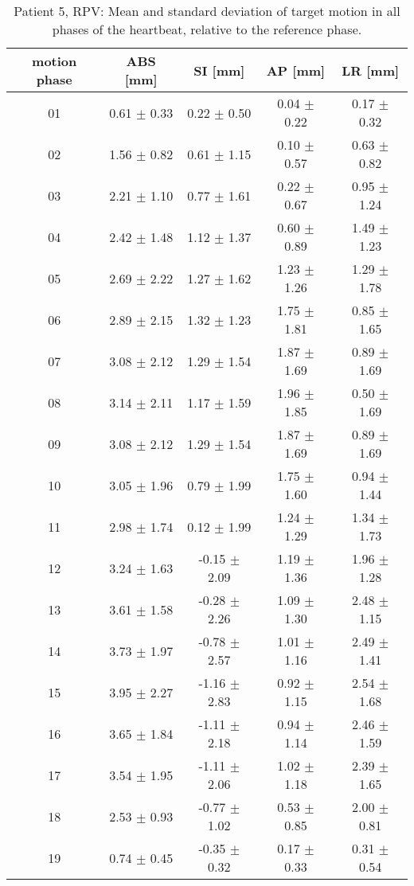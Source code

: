 \begin{table}[htbp]
  \centering
    \tiny
  \caption{Patient 5, RPV: Mean and standard deviation of target motion in all phases of the heartbeat, relative to the reference phase.}
  \begin{tabular}{|c|c|c|c|c|}
    \hline\hline
    motion phase\rule{0pt}{2.6ex}\rule[-1.2ex]{0pt}{0pt} & ABS [mm] & SI [mm] & AP [mm] & LR [mm]\\
    \hline
01& 0.61 $\pm$ 0.33& 0.22 $\pm$ 0.50& 0.04 $\pm$ 0.22& 0.17 $\pm$ 0.32 \\
02& 1.56 $\pm$ 0.82& 0.61 $\pm$ 1.15& 0.10 $\pm$ 0.57& 0.63 $\pm$ 0.82 \\ 
03& 2.21 $\pm$ 1.10& 0.77 $\pm$ 1.61& 0.22 $\pm$ 0.67& 0.95 $\pm$ 1.24 \\
04& 2.42 $\pm$ 1.48& 1.12 $\pm$ 1.37& 0.60 $\pm$ 0.89& 1.49 $\pm$ 1.23 \\
05& 2.69 $\pm$ 2.22& 1.27 $\pm$ 1.62& 1.23 $\pm$ 1.26& 1.29 $\pm$ 1.78 \\
06& 2.89 $\pm$ 2.15& 1.32 $\pm$ 1.23& 1.75 $\pm$ 1.81& 0.85 $\pm$ 1.65 \\
07& 3.08 $\pm$ 2.12& 1.29 $\pm$ 1.54& 1.87 $\pm$ 1.69& 0.89 $\pm$ 1.69 \\
08& 3.14 $\pm$ 2.11& 1.17 $\pm$ 1.59& 1.96 $\pm$ 1.85& 0.50 $\pm$ 1.69 \\
09& 3.08 $\pm$ 2.12& 1.29 $\pm$ 1.54& 1.87 $\pm$ 1.69& 0.89 $\pm$ 1.69 \\
10& 3.05 $\pm$ 1.96& 0.79 $\pm$ 1.99& 1.75 $\pm$ 1.60& 0.94 $\pm$ 1.44 \\
11& 2.98 $\pm$ 1.74& 0.12 $\pm$ 1.99& 1.24 $\pm$ 1.29& 1.34 $\pm$ 1.73 \\
12& 3.24 $\pm$ 1.63& -0.15 $\pm$ 2.09& 1.19 $\pm$ 1.36& 1.96 $\pm$ 1.28 \\
13& 3.61 $\pm$ 1.58& -0.28 $\pm$ 2.26& 1.09 $\pm$ 1.30& 2.48 $\pm$ 1.15 \\
14& 3.73 $\pm$ 1.97& -0.78 $\pm$ 2.57& 1.01 $\pm$ 1.16& 2.49 $\pm$ 1.41 \\
15& 3.95 $\pm$ 2.27& -1.16 $\pm$ 2.83& 0.92 $\pm$ 1.15& 2.54 $\pm$ 1.68 \\
16& 3.65 $\pm$ 1.84& -1.11 $\pm$ 2.18& 0.94 $\pm$ 1.14& 2.46 $\pm$ 1.59 \\
17& 3.54 $\pm$ 1.95& -1.11 $\pm$ 2.06& 1.02 $\pm$ 1.18& 2.39 $\pm$ 1.65 \\
18& 2.53 $\pm$ 0.93& -0.77 $\pm$ 1.02& 0.53 $\pm$ 0.85& 2.00 $\pm$ 0.81 \\
19& 0.74 $\pm$ 0.45& -0.35 $\pm$ 0.32& 0.17 $\pm$ 0.33& 0.31 $\pm$ 0.54 \\
    \hline\hline
  \end{tabular}
\end{table}

